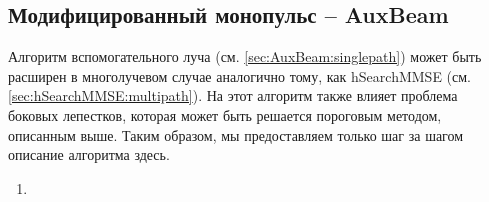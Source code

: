 \subsection[Модифицированный монопульс]{Модифицированный монопульс -- AuxBeam}
\label{sec:AuxBeam:multipath}


Алгоритм вспомогательного луча (см. \ref{sec:AuxBeam:singlepath}) 
может быть расширен в многолучевом
случае аналогично тому, как hSearchMMSE (см. \ref{sec:hSearchMMSE:multipath}). 
На этот алгоритм также влияет проблема боковых лепестков, которая может быть
решается пороговым методом, описанным выше. Таким образом, мы предоставляем
только шаг за шагом описание алгоритма здесь.

\begin{enumerate}[label=\textbf{Шаг \arabic*:}]
    \item 
\end{enumerate}


